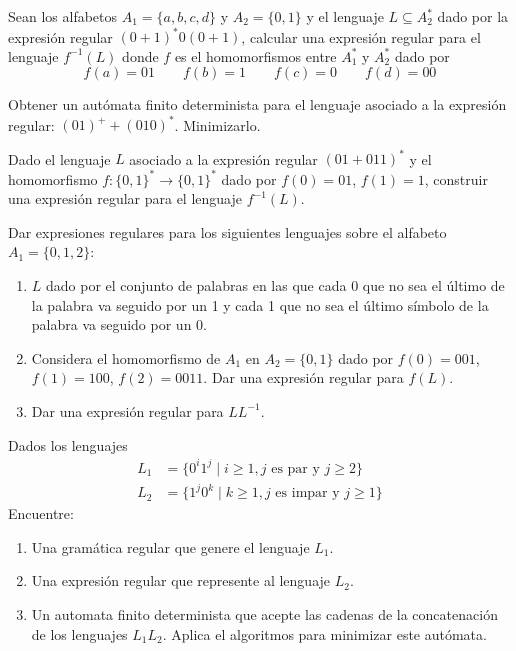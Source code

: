 \begin{ejercicio}\label{ej:1.3.29}
    Sean los alfabetos $A_1=\{a,b,c,d\}$ y $A_2=\{0,1\}$ y el lenguaje $L\subseteq A^\ast_2$ dado por la expresión regular ${(0+1)}^{\ast}0(0+1)$, calcular una expresión regular para el lenguaje $f^{-1}(L)$ donde $f$ es el homomorfismos entre $A^\ast_1$ y $A^\ast_2$ dado por
    \begin{equation*}
        f(a)=01 \qquad f(b) = 1 \qquad f(c)=0 \qquad f(d)=00
    \end{equation*}
\end{ejercicio}

\begin{ejercicio}\label{ej:1.3.30}
    Obtener un autómata finito determinista para el lenguaje asociado a la expresión regular: ${(01)}^{+}+{(010)}^{\ast}$. Minimizarlo.
\end{ejercicio}

\begin{ejercicio}\label{ej:1.3.31}
    Dado el lenguaje $L$ asociado a la expresión regular ${(01+011)}^{\ast}$ y el homomorfismo $f:{\{0,1\}}^{\ast}\rightarrow{\{0,1\}}^{\ast}$ dado por $f(0)=01$, $f(1)=1$, construir una expresión regular para el lenguaje $f^{-1}(L)$.
\end{ejercicio}

\begin{ejercicio}\label{ej:1.3.32}
    Dar expresiones regulares para los siguientes lenguajes sobre el alfabeto $A_1=\{0,1,2\}$:
    \begin{enumerate}
        \item $L$ dado por el conjunto de palabras en las que cada 0 que no sea el último de la palabra va seguido por un 1 y cada 1 que no sea el último símbolo de la palabra va seguido por un 0.
        \item Considera el homomorfismo de $A_1$ en $A_2=\{0,1\}$  dado por $f(0)=001$, $f(1)=100$, $f(2)=0011$. Dar una expresión regular para $f(L)$.
        \item Dar una expresión regular para $LL^{-1}$.
    \end{enumerate}
\end{ejercicio}

\begin{ejercicio}\label{ej:1.3.33}
    Dados los lenguajes
    \begin{align*}
        L_1 &= \{0^i 1^j \mid i\geq 1, j\text{ es par y } j\geq 2\}\\
        L_2 &= \{1^j 0^k \mid k\geq 1, j\text{ es impar y } j\geq 1\}
    \end{align*}
    Encuentre:
    \begin{enumerate}
        \item Una gramática regular que genere el lenguaje $L_1$.
        \item Una expresión regular que represente al lenguaje $L_2$.
        \item Un automata finito determinista que acepte las cadenas de la concatenación de los lenguajes $L_1L_2$. Aplica el algoritmos para minimizar este autómata.
    \end{enumerate}
\end{ejercicio}


